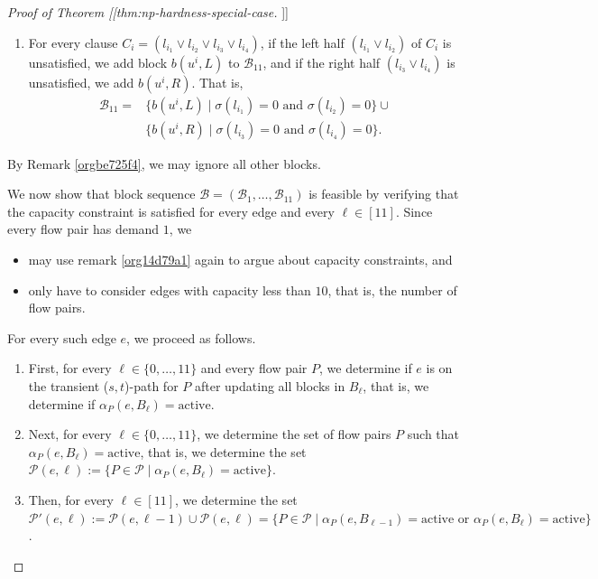 \documentclass[fontsize=11pt,paper=a4]{book}
\begin{document}
\begin{proof}[Proof of Theorem [[thm:np-hardness-special-case]]]
\begin{enumerate}
\item For every clause \(C_i=(l_{i_1}\vee l_{i_2}\vee l_{i_3}\vee l_{i_4})\), if the left half \((l_{i_1}\vee l_{i_2})\) of \(C_i\) is unsatisfied, we add block \(b(u^i,L)\) to \(\mathscr{B}_{11}\), and if the right half \((l_{i_3}\vee l_{i_4})\) is unsatisfied, we add \(b(u^i,R)\).
That is,
\begin{align*}
\mathscr{B}_{11}=&\{b(u^i,L)\mid\sigma(l_{i_1})=0\text{ and }\sigma(l_{i_2})=0\}\cup\\
&\{b(u^i,R)\mid\sigma(l_{i_3})=0\text{ and }\sigma(l_{i_4})=0\}.
\end{align*}
\end{enumerate}

By Remark \ref{orgbe725f4}, we may ignore all other blocks.

We now show that block sequence \(\mathcal{B}=(\mathscr{B}_1,\dots,\mathscr{B}_{11})\) is feasible by verifying that the capacity constraint is satisfied for every edge and every \(\ell\in[11]\).
Since every flow pair has demand \(1\), we

\begin{itemize}
\item may use remark \ref{org14d79a1} again to argue about capacity constraints, and

\item only have to consider edges with capacity less than \(10\), that is, the number of flow pairs.
\end{itemize}


For every such edge \(e\), we proceed as follows.

\begin{enumerate}
\item First, for every \(\ell\in\{0,\dots,11\}\) and every flow pair \(P\), we determine if \(e\) is on the transient (\(s,t\))-path for \(P\) after updating all blocks in \(B_{\ell}\), that is, we determine if \(\alpha_P(e,B_{\ell})=\mathrm{active}\).

\item Next, for every \(\ell\in\{0,\dots,11\}\), we determine the set of flow pairs \(P\) such that \(\alpha_P(e,B_{\ell})=\mathrm{active}\), that is, we determine the set \(\mathcal{P}(e,\ell):=\{P\in\mathcal{P}\mid\alpha_P(e,B_{\ell})=\mathrm{active}\}\).

\item Then, for every \(\ell\in[11]\), we determine the set \(\mathcal{P}'(e,\ell):=\mathcal{P}(e,\ell-1)\cup\mathcal{P}(e,\ell)=\{P\in\mathcal{P}\mid\alpha_P(e,B_{\ell-1})=\mathrm{active}\text{ or }\alpha_P(e,B_{\ell})=\mathrm{active}\}\).


\end{enumerate}
\end{proof}
\end{document}
